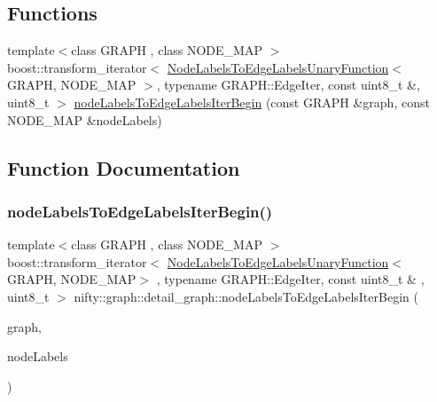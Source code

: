\subsection*{Functions}
\begin{DoxyCompactItemize}
\item 
{\footnotesize template$<$class G\+R\+A\+PH , class N\+O\+D\+E\+\_\+\+M\+AP $>$ }\\boost\+::transform\+\_\+iterator$<$ \hyperlink{classnifty_1_1graph_1_1detail__graph_1_1NodeLabelsToEdgeLabelsUnaryFunction}{Node\+Labels\+To\+Edge\+Labels\+Unary\+Function}$<$ G\+R\+A\+PH, N\+O\+D\+E\+\_\+\+M\+AP $>$, typename G\+R\+A\+P\+H\+::\+Edge\+Iter, const uint8\+\_\+t \&, uint8\+\_\+t $>$ \hyperlink{namespacenifty_1_1graph_1_1detail__graph_abfe97acf5c16e1fbb32f1eb7fef344b1}{node\+Labels\+To\+Edge\+Labels\+Iter\+Begin} (const G\+R\+A\+PH \&graph, const N\+O\+D\+E\+\_\+\+M\+AP \&node\+Labels)
\end{DoxyCompactItemize}


\subsection{Function Documentation}
\mbox{\label{namespacenifty_1_1graph_1_1detail__graph_abfe97acf5c16e1fbb32f1eb7fef344b1}} 
\subsubsection{\texorpdfstring{node\+Labels\+To\+Edge\+Labels\+Iter\+Begin()}{nodeLabelsToEdgeLabelsIterBegin()}}
{\footnotesize\ttfamily template$<$class G\+R\+A\+PH , class N\+O\+D\+E\+\_\+\+M\+AP $>$ \\
boost\+::transform\+\_\+iterator$<$ \hyperlink{classnifty_1_1graph_1_1detail__graph_1_1NodeLabelsToEdgeLabelsUnaryFunction}{Node\+Labels\+To\+Edge\+Labels\+Unary\+Function}$<$G\+R\+A\+PH, N\+O\+D\+E\+\_\+\+M\+AP$>$ , typename G\+R\+A\+P\+H\+::\+Edge\+Iter, const uint8\+\_\+t \& , uint8\+\_\+t $>$ nifty\+::graph\+::detail\+\_\+graph\+::node\+Labels\+To\+Edge\+Labels\+Iter\+Begin (\begin{DoxyParamCaption}\item[{const G\+R\+A\+PH \&}]{graph,  }\item[{const N\+O\+D\+E\+\_\+\+M\+AP \&}]{node\+Labels }\end{DoxyParamCaption})}

